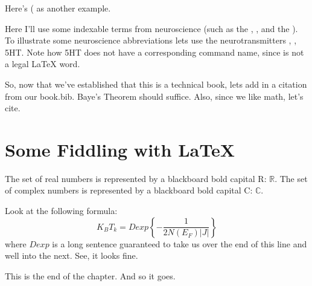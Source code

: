 Here's \VR ( as another example.

\LineSeparator

Here I'll use some indexable terms from neuroscience (such as the , , and the ). To illustrate some neuroscience abbreviations lets use the neurotransmitters \NE, \DA, \ac{5HT}. Note how 5HT does not have a corresponding command name, since is not a legal LaTeX word.

So, now that we've established that this is a technical book, lets add in a citation from our book.bib.  Baye's Theorem should suffice\cite{bayes1763}. Also, since we like math, let's cite\cite{laplace1774}.

\LineSeparator
\section{Some Fiddling with LaTeX}

\newcommand{\Reals}{$\mathbb{R}$}
\newcommand{\Complex}{$\mathbb{C}$}
%    
   
The set of real numbers is represented by a blackboard bold capital R: \Reals.
The set of complex numbers is represented by a blackboard bold capital C: \Complex.

%
%    
    
Look at the following formula:
%
\begin{equation}
K_BT_k=Dexp\left\lbrace -\frac{1}{2N(E_F)|J|}\right\rbrace
\end{equation}
%
where $Dexp$ is a long sentence guaranteed to take us over the
end of this line and well into the next. See, it looks fine.

\blindtext[4]

This is the end of the chapter. And so it goes.
